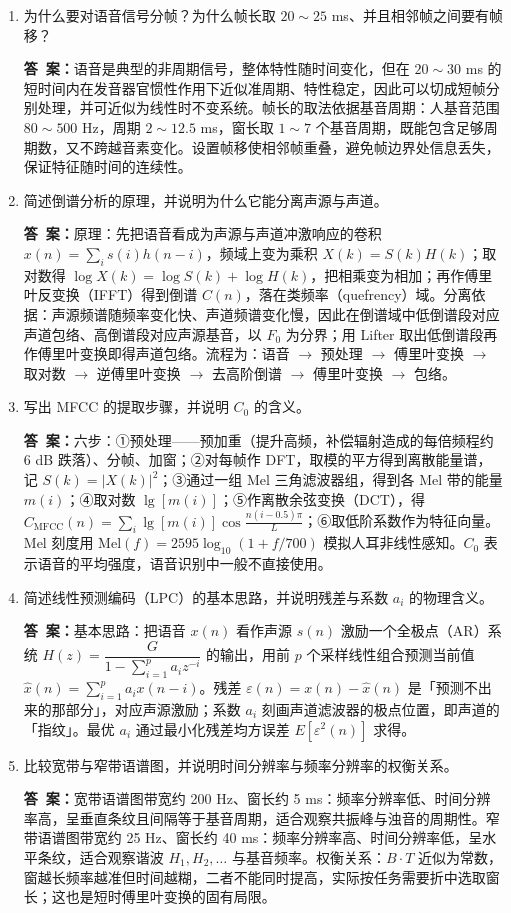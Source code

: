 \documentclass[10.5pt]{ctexart}
\newenvironment{qlist}
  {\begin{enumerate}[label={\sffamily\bfseries\color{accent}\arabic*.},leftmargin=2.4em,labelsep=0.55em,itemsep=0.62em,topsep=0.15em,parsep=0.3em,partopsep=0pt]}
  {\end{enumerate}}
\newcommand{\anslabel}{{\sffamily\bfseries\color{accent}答\ 案：}\hspace{0.35em}}
\newcommand{\ansL}[1]{\par\vspace{3.6\baselineskip}\begin{ansbox}\anslabel #1\end{ansbox}}
\begin{document}
\begin{qlist}

\item 为什么要对语音信号分帧？为什么帧长取 $20\sim 25$ ms、并且相邻帧之间要有帧移？
\ansL{语音是典型的非周期信号，整体特性随时间变化，但在 $20\sim 30$ ms 的短时间内在发音器官惯性作用下近似准周期、特性稳定，因此可以切成短帧分别处理，并可近似为线性时不变系统。帧长的取法依据基音周期：人基音范围 $80\sim 500$ Hz，周期 $2\sim 12.5$ ms，窗长取 $1\sim 7$ 个基音周期，既能包含足够周期数，又不跨越音素变化。设置帧移使相邻帧重叠，避免帧边界处信息丢失，保证特征随时间的连续性。}

\item 简述倒谱分析的原理，并说明为什么它能分离声源与声道。
\ansL{原理：先把语音看成为声源与声道冲激响应的卷积 $x(n)=\sum_i s(i)h(n-i)$，频域上变为乘积 $X(k)=S(k)H(k)$；取对数得 $\log X(k)=\log S(k)+\log H(k)$，把相乘变为相加；再作傅里叶反变换（IFFT）得到倒谱 $C(n)$，落在类频率（quefrency）域。分离依据：声源频谱随频率变化快、声道频谱变化慢，因此在倒谱域中低倒谱段对应声道包络、高倒谱段对应声源基音，以 $F_0$ 为分界；用 Lifter 取出低倒谱段再作傅里叶变换即得声道包络。流程为：语音 $\to$ 预处理 $\to$ 傅里叶变换 $\to$ 取对数 $\to$ 逆傅里叶变换 $\to$ 去高阶倒谱 $\to$ 傅里叶变换 $\to$ 包络。}

\item 写出 MFCC 的提取步骤，并说明 $C_0$ 的含义。
\ansL{六步：①预处理——预加重（提升高频，补偿辐射造成的每倍频程约 6 dB 跌落）、分帧、加窗；②对每帧作 DFT，取模的平方得到离散能量谱，记 $S(k)=|X(k)|^2$；③通过一组 Mel 三角滤波器组，得到各 Mel 带的能量 $m(i)$；④取对数 $\lg[m(i)]$；⑤作离散余弦变换（DCT），得 $C_{\mathrm{MFCC}}(n)=\sum_i \lg[m(i)]\cos\frac{n(i-0.5)\pi}{L}$；⑥取低阶系数作为特征向量。Mel 刻度用 $\mathrm{Mel}(f)=2595\log_{10}(1+f/700)$ 模拟人耳非线性感知。$C_0$ 表示语音的平均强度，语音识别中一般不直接使用。}

\item 简述线性预测编码（LPC）的基本思路，并说明残差与系数 $a_i$ 的物理含义。
\ansL{基本思路：把语音 $x(n)$ 看作声源 $s(n)$ 激励一个全极点（AR）系统 $H(z)=\dfrac{G}{1-\sum_{i=1}^{p}a_iz^{-i}}$ 的输出，用前 $p$ 个采样线性组合预测当前值 $\hat x(n)=\sum_{i=1}^{p}a_ix(n-i)$。残差 $\varepsilon(n)=x(n)-\hat x(n)$ 是「预测不出来的那部分」，对应声源激励；系数 $a_i$ 刻画声道滤波器的极点位置，即声道的「指纹」。最优 $a_i$ 通过最小化残差均方误差 $E[\varepsilon^2(n)]$ 求得。}

\item 比较宽带与窄带语谱图，并说明时间分辨率与频率分辨率的权衡关系。
\ansL{宽带语谱图带宽约 200 Hz、窗长约 5 ms：频率分辨率低、时间分辨率高，呈垂直条纹且间隔等于基音周期，适合观察共振峰与浊音的周期性。窄带语谱图带宽约 25 Hz、窗长约 40 ms：频率分辨率高、时间分辨率低，呈水平条纹，适合观察谐波 $H_1,H_2,\dots$ 与基音频率。权衡关系：$B\cdot T$ 近似为常数，窗越长频率越准但时间越糊，二者不能同时提高，实际按任务需要折中选取窗长；这也是短时傅里叶变换的固有局限。}

\end{qlist}
\end{document}
